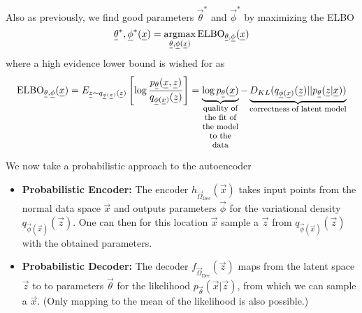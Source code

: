
Also as previously, we find good parameters $\vec{\theta}^*$ and $\vec{\phi}^*$ by maximizing the ELBO
\begin{equation}
    \vec{\theta}^*, \vec{\phi}^*(\vec{x}) = \argmax_{\vec{\theta}, \vec{\phi}(\vec{x})} \text{ELBO}_{\vec{\theta}, \vec{\phi}}(\vec{x})
\end{equation}
where a high evidence lower bound is wished for as
\begin{equation}
    \text{ELBO}_{\vec{\theta}, \vec{\phi}}(\vec{x}) = E_{\vec{z} \sim q_{\vec{\phi}(\vec{x})}(\vec{z})} \left[ \log \frac{p_\vec{\theta}(\vec{x},\vec{z})}{q_{\vec{\phi}(\vec{x})}(\vec{z})} \right] = \explain{\log p_\vec{\theta}(\vec{x})}{quality of the fit of the model to the data} - \explain{D_{KL}(q_{\vec{\phi}(\vec{x})}(\vec{z}) || p_{\vec{\theta}}(\vec{z}|\vec{x}))}{correctness of latent model}
\end{equation}

We now take a probabilistic approach to the autoencoder
\begin{itemize}
    \item \textbf{Probabilistic Encoder:} The encoder $h_{\vec{\Omega}_{\text{Dec}}}(\vec{x})$ takes input points from the normal data space $\vec{x}$ and outputs
    parameters $\vec{\phi}$ for the variational density $q_{\vec{\phi}(\vec{x})}(\vec{z})$. One can then
    for this location $\vec{x}$ sample a $\vec{z}$ from $q_{\vec{\phi}(\vec{x})}(\vec{z})$ with the
    obtained parameters. 
    \item \textbf{Probabilistic Decoder:} The decoder $f_{\vec{\Omega}_{\text{Dec}}}(\vec{z})$ maps from the latent space $\vec{z}$ to 
    to parameters $\vec{\theta}$ for the likelihood $p_{\vec{\theta}}(\vec{x}|\vec{z})$, from 
    which we can sample a $\vec{x}$. (Only mapping to the mean of the likelihood is also possible.)
\end{itemize}

